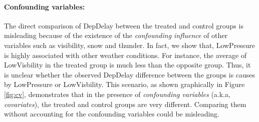  \paragraph{\bf Confounding variables:} %
The direct comparison of DepDelay between the treated and control
groups is misleading because of the existence of the {\em  confounding
  influence} of other variables such as visibility, snow and thunder.
In fact, we show that, LowPressure is highly associated with other
weather conditions. For instance, the average of LowVisbility in the
treated group is much less  than
  the opposite group. Thus, it is unclear whether the observed DepDelay difference between the groups is causes by LowPressure or LowVisbility. This scenario, as shown graphically in Figure \ref{fig:cv}, demonstrates that in the presence of {\em confounding variables} (a.k.a, {\em covariates}), the treated and control groups are very different. Comparing them without accounting for the confounding variables could be misleading.



